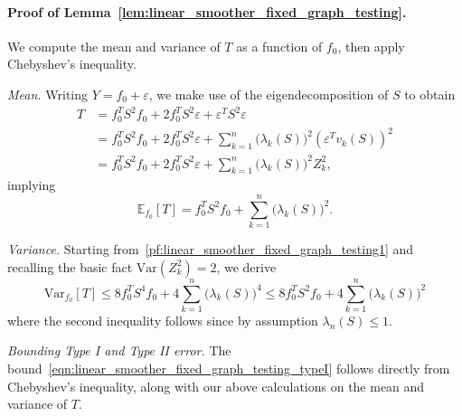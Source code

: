 \documentclass{article}
\newcommand{\Var}{\mathrm{Var}}
\newcommand{\1}{\mathbf{1}}
\newcommand{\Ebb}{\mathbb{E}}
\theoremstyle{alden}
\theoremstyle{aldenthm}
\theoremstyle{definition}
\theoremstyle{remark}
\begin{document}
\paragraph{Proof of Lemma~\ref{lem:linear_smoother_fixed_graph_testing}.}
	We compute the mean and variance of $T$ as a function of $f_0$, then apply Chebyshev's inequality.
	
	\textit{Mean.} Writing $Y = f_0 + \varepsilon$, we make use of the eigendecomposition of $S$ to obtain
	\begin{equation}
	\label{pf:linear_smoother_fixed_graph_testing1}
	\begin{aligned}
	T & = f_0^T S^2 f_0 + 2 f_0^T S^2 \varepsilon + \varepsilon^T S^2 \varepsilon \\
	& = f_0^T S^2 f_0 + 2 f_0^T S^2 \varepsilon + \sum_{k = 1}^{n}  \bigl(\lambda_k(S)\bigr)^2 (\varepsilon^T v_k(S))^2 \\
	& = f_0^T S^2 f_0 + 2 f_0^T S^2 \varepsilon + \sum_{k = 1}^{n}  \bigl(\lambda_k(S)\bigr)^2 Z_k^2,
	\end{aligned}
	\end{equation}
	implying
	\begin{equation}
	\label{pf:linear_smoother_fixed_graph_testing_mean}
	\Ebb_{f_0}[T] = f_0^T S^2 f_0 + \sum_{k = 1}^{n} \bigl(\lambda_k(S)\bigr)^2.
	\end{equation}
	
	\textit{Variance.} Starting from~\eqref{pf:linear_smoother_fixed_graph_testing1} and recalling the basic fact $\Var(Z_k^2) = 2$, we derive
	\begin{equation}
	\label{pf:linear_smoother_fixed_graph_testing_var}
	\Var_{f_0}[T] \leq 8 f_0^T S^4 f_0 + 4 \sum_{k = 1}^{n} \bigl(\lambda_k(S)\bigr)^4 \leq 8 f_0^T S^2 f_0 + 4 \sum_{k = 1}^{n} \bigl(\lambda_k(S)\bigr)^2
	\end{equation}
	where the second inequality follows since by assumption $\lambda_{n}(S) \leq 1$.
	
	\textit{Bounding Type I and Type II error.} The bound~\eqref{eqn:linear_smoother_fixed_graph_testing_typeI} follows directly from Chebyshev's inequality, along with our above calculations on the mean and variance of $T$.
	
\end{document}
